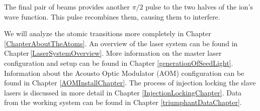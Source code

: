The final pair of beams provides another $\pi/2$ pulse to the two halves of the ion's wave function. This pulse recombines them, causing them to interfere.


We will analyze the atomic transitions more completely in Chapter\,\ref{ChapterAboutTheAtoms}. An overview of the laser system can be found in Chapter\,\ref{LaserSystemOverview}. More information on the master laser configuration and setup can be found in Chapter \ref{generationOfSeedLight}. Information about the Acousto Optic Modulator (AOM) configuration can be found in Chapter \ref{AOMInstallChapter}. The process of injection locking the slave lasers is discussed in more detail in Chapter \ref{InjectionLockingChapter}. Data from the working system can be found in Chapter \ref{triumphantDataChapter}.




